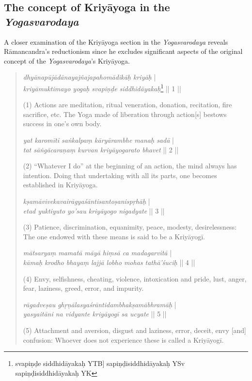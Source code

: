 \subsection{The concept of Kriyāyoga in the \textit{Yogasvarodaya}}
A closer examination of the Kriyāyoga section in the \textit{Yogasvarodaya} reveals Rāmancandra's reductionism since he excludes significant aspects of the original concept of the \textit{Yogasvarodaya}'s Kriyāyoga.


\begin{quote}
\textit{dhyānapūjādānayajñajapahomādikāḥ kriyāḥ} |\\
\textit{kriyāmuktimayo yogaḥ svapiṇḍe siddhidāyakaḥ}\footnote{svapiṇḍe siddhidāyakaḥ YTB] sapiṇḍisiddhidāyakaḥ YSv sapiṇḍisiddhidāyakaḥ YK} || 1 ||

(1) Actions are meditation, ritual veneration, donation, recitation, fire sacrifice, etc. 
The Yoga made of liberation through action[s] bestows success in one's own body. 

\textit{yat karomīti saṅkalpaṃ kāryārambhe manaḥ sadā} |\\
\textit{tat sāṅgācaraṇaṃ kurvan kriyāyogarato bhavet} || 2 ||

(2) ``Whatever I do'' at the beginning of an action, the mind always has intention.  
Doing that undertaking with all its parts, one becomes established in Kriyāyoga. 

\textit{kṣamāvivekavairāgyaśāntisantoṣanispṛhāḥ} |\\
\textit{etad yuktiyuto yo'sau kriyāyogo nigadyate} || 3 ||

(3) Patience, discrimination, equanimity, peace, modesty, desirelessness:
The one endowed with these means is said to be a Kriyāyogī.

\textit{mātsaryaṃ mamatā māyā hiṃsā ca madagarvitā} |\\
\textit{kāmaḥ krodho bhayaṃ lajjā lobho mohas tathā'śuciḥ} || 4 ||

(4) Envy, selfishness, cheating, violence, intoxication and pride,
lust, anger, fear, laziness, greed, error, and impurity.

\textit{rāgadveṣau ghṛṇālasyaśrāntidambhakṣamābhramāḥ} |\\
\textit{yasyaitāni na vidyante kriyāyogī sa ucyate} || 5 ||

(5) Attachment and aversion, disgust and laziness, error, deceit, envy [and] confusion:
Whoever does not experience these is called a Kriyāyogī.


\end{quote}
